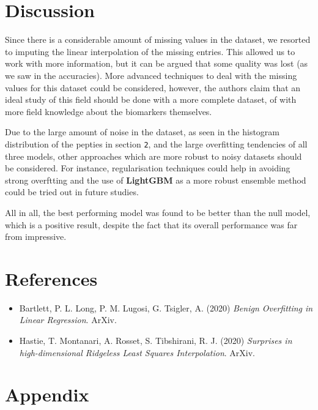 \documentclass[11pt]{article}
\providecommand{\tightlist}{%
      \setlength{\itemsep}{0pt}\setlength{\parskip}{0pt}}
\begin{document}
    \hypertarget{discussion}{%
\section{Discussion}\label{discussion}}

    Since there is a considerable amount of missing values in the dataset,
we resorted to imputing the linear interpolation of the missing entries.
This allowed us to work with more information, but it can be argued that
some quality was lost (as we saw in the accuracies). More advanced
techniques to deal with the missing values for this dataset could be
considered, however, the authors claim that an ideal study of this field
should be done with a more complete dataset, of with more field
knowledge about the biomarkers themselves.

Due to the large amount of noise in the dataset, as seen in the
histogram distribution of the pepties in section \texttt{2}, and the
large overfitting tendencies of all three models, other approaches which
are more robust to noisy datasets should be considered. For instance,
regularisation techniques could help in avoiding strong overftting and
the use of \textbf{LightGBM} as a more robust ensemble method could be
tried out in future studies.

All in all, the best performing model was found to be better than the
null model, which is a positive result, despite the fact that its
overall performance was far from impressive.

    \hypertarget{references}{%
\section{References}\label{references}}

\begin{itemize}
\tightlist
\item
  Bartlett, P. L. Long, P. M. Lugosi, G. Tsigler, A. (2020) \emph{Benign
  Overfitting in Linear Regression}. ArXiv.
\item
  Hastie, T. Montanari, A. Rosset, S. Tibshirani, R. J. (2020)
  \emph{Surprises in high-dimensional Ridgeless Least Squares
  Interpolation}. ArXiv.
\end{itemize}

\newpage
    \hypertarget{appendix}{%
\section{Appendix}\label{appendix}}
\end{document}
